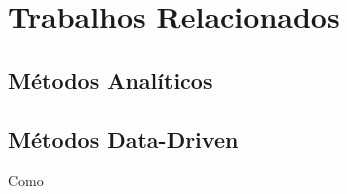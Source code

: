 \chapter{Trabalhos Relacionados}

\section{Métodos Analíticos}

\section{Métodos Data-Driven}
Como \cite{visualIndicatedSounds}

